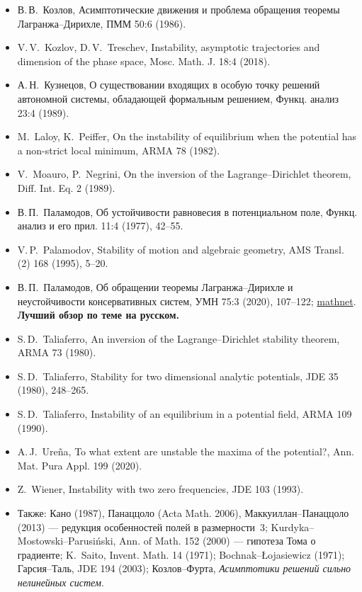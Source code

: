 \documentclass[11pt,a4paper]{article}
\theoremstyle{definition}
\begin{document}
\begin{itemize}[leftmargin=*,itemsep=1pt]
\item[{[Ko86]}] В.\,В.~Козлов, Асимптотические движения и проблема обращения теоремы Лагранжа--Дирихле, ПММ 50:6 (1986).
\item[{[KT18]}] V.\,V.~Kozlov, D.\,V.~Treschev, Instability, asymptotic trajectories and dimension of the phase space, Mosc. Math. J. 18:4 (2018).
\item[{[Ku89]}] А.\,Н.~Кузнецов, О существовании входящих в особую точку решений автономной системы, обладающей формальным решением, Функц. анализ 23:4 (1989).
\item[{[LP82]}] M.~Laloy, K.~Peiffer, On the instability of equilibrium when the potential has a non-strict local minimum, ARMA 78 (1982).
\item[{[MN89]}] V.~Moauro, P.~Negrini, On the inversion of the Lagrange--Dirichlet theorem, Diff. Int. Eq. 2 (1989).
\item[{[Pa77]}] В.\,П.~Паламодов, Об устойчивости равновесия в потенциальном поле, Функц. анализ и его прил. 11:4 (1977), 42--55.
\item[{[Pa95]}] V.\,P.~Palamodov, Stability of motion and algebraic geometry, AMS Transl. (2) 168 (1995), 5--20.
\item[{[Pa20]}] В.\,П.~Паламодов, Об обращении теоремы Лагранжа--Дирихле и неустойчивости консервативных систем, УМН 75:3 (2020), 107--122; \href{https://www.mathnet.ru/eng/rm9945}{mathnet}. \textbf{Лучший обзор по теме на русском.}
\item[{[Ta80a]}] S.\,D.~Taliaferro, An inversion of the Lagrange--Dirichlet stability theorem, ARMA 73 (1980).
\item[{[Ta80b]}] S.\,D.~Taliaferro, Stability for two dimensional analytic potentials, JDE 35 (1980), 248--265.
\item[{[Ta90]}] S.\,D.~Taliaferro, Instability of an equilibrium in a potential field, ARMA 109 (1990).
\item[{[Ur20]}] A.\,J.~Ureña, To what extent are unstable the maxima of the potential?, Ann. Mat. Pura Appl. 199 (2020).
\item[{[Wi93]}] Z.~Wiener, Instability with two zero frequencies, JDE 103 (1993).
\item[] Также: Кано (1987), Панаццоло (Acta Math. 2006), Маккуиллан--Панаццоло (2013) --- редукция особенностей полей в размерности~3; Kurdyka--Mostowski--Parusiński, Ann. of Math. 152 (2000) --- гипотеза Тома о градиенте; K.~Saito, Invent. Math. 14 (1971); Bochnak--Łojasiewicz (1971); Гарсия--Таль, JDE 194 (2003); Козлов--Фурта, \emph{Асимптотики решений сильно нелинейных систем}.
\end{itemize}
\end{document}
